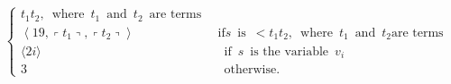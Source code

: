 \begin{definition}
\[\begin{cases}
t_{1} t_{2}, \enspace \text{where} \enspace t_{1} \enspace \text{and} \enspace
t_{2} \enspace \text{are terms} \enspace \\ \left\langle 19,\left\ulcorner
t_{1}\right\urcorner,\left\ulcorner t_{2}\right\urcorner\right\rangle & \text {
if} s \enspace \text{is} \enspace<t_{1} t_{2}, \enspace \text{where} \enspace
t_{1} \enspace \text{and} \enspace t_{2} \text {are terms} \\ \langle 2 i\rangle
                                                                      & \enspace
\text{if} \enspace s \enspace \text{is the variable} \enspace v_{i} \\ 3 &
\enspace \text{otherwise.} \enspace
\end{cases}
\]


\end{definition}
